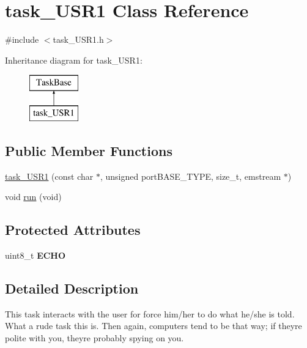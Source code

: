 \hypertarget{classtask__USR1}{}\section{task\+\_\+\+U\+S\+R1 Class Reference}
\label{classtask__USR1}


{\ttfamily \#include $<$task\+\_\+\+U\+S\+R1.\+h$>$}

Inheritance diagram for task\+\_\+\+U\+S\+R1\+:\begin{figure}[H]
\begin{center}
\leavevmode
\includegraphics[height=2.000000cm]{classtask__USR1}
\end{center}
\end{figure}
\subsection*{Public Member Functions}
\begin{DoxyCompactItemize}
\item 
\mbox{\hyperlink{classtask__USR1_a09b56d4b1411901f63f762174266ecfa}{task\+\_\+\+U\+S\+R1}} (const char $\ast$, unsigned port\+B\+A\+S\+E\+\_\+\+T\+Y\+PE, size\+\_\+t, emstream $\ast$)
\item 
void \mbox{\hyperlink{classtask__USR1_a95b84a7b7f293a56470b74eb541fe346}{run}} (void)
\end{DoxyCompactItemize}
\subsection*{Protected Attributes}
\begin{DoxyCompactItemize}
\item 
\mbox{\label{classtask__USR1_a306766d3d24e1682f19c2e5ee4c3d8ce}} 
uint8\+\_\+t {\bfseries E\+C\+HO}
\end{DoxyCompactItemize}


\subsection{Detailed Description}
This task interacts with the user for force him/her to do what he/she is told. What a rude task this is. Then again, computers tend to be that way; if they\textquotesingle{}re polite with you, they\textquotesingle{}re probably spying on you. 

